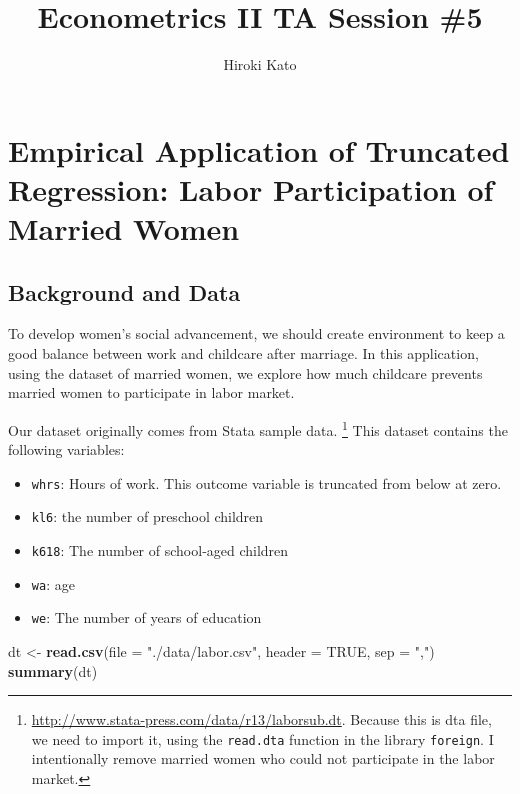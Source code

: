 \documentclass[
  12pt,
]{article}
\title{Econometrics II TA Session \#5}
\author{Hiroki Kato}
\date{}
\newenvironment{Shaded}{\begin{snugshade}}{\end{snugshade}}
\newcommand{\DataTypeTok}[1]{\textcolor[rgb]{0.13,0.29,0.53}{#1}}
\newcommand{\KeywordTok}[1]{\textcolor[rgb]{0.13,0.29,0.53}{\textbf{#1}}}
\newcommand{\NormalTok}[1]{#1}
\newcommand{\OtherTok}[1]{\textcolor[rgb]{0.56,0.35,0.01}{#1}}
\newcommand{\StringTok}[1]{\textcolor[rgb]{0.31,0.60,0.02}{#1}}
\providecommand{\tightlist}{%
  \setlength{\itemsep}{0pt}\setlength{\parskip}{0pt}}
\begin{document}
\maketitle

\hypertarget{empirical-application-of-truncated-regression-labor-participation-of-married-women}{%
\section{Empirical Application of Truncated Regression: Labor
Participation of Married
Women}\label{empirical-application-of-truncated-regression-labor-participation-of-married-women}}

\hypertarget{background-and-data}{%
\subsection{Background and Data}\label{background-and-data}}

To develop women's social advancement, we should create environment to
keep a good balance between work and childcare after marriage. In this
application, using the dataset of married women, we explore how much
childcare prevents married women to participate in labor market.

Our dataset originally comes from Stata sample data. \footnote{\url{http://www.stata-press.com/data/r13/laborsub.dt}.
  Because this is dta file, we need to import it, using the
  \texttt{read.dta} function in the library \texttt{foreign}. I
  intentionally remove married women who could not participate in the
  labor market.} This dataset contains the following variables:

\begin{itemize}
\tightlist
\item
  \texttt{whrs}: Hours of work. This outcome variable is truncated from
  below at zero.
\item
  \texttt{kl6}: the number of preschool children
\item
  \texttt{k618}: The number of school‐aged children
\item
  \texttt{wa}: age
\item
  \texttt{we}: The number of years of education
\end{itemize}

\begin{Shaded}
\begin{Highlighting}[]
\NormalTok{dt \textless{}{-}}\StringTok{ }\KeywordTok{read.csv}\NormalTok{(}\DataTypeTok{file =} \StringTok{"./data/labor.csv"}\NormalTok{, }\DataTypeTok{header =} \OtherTok{TRUE}\NormalTok{,  }\DataTypeTok{sep =} \StringTok{","}\NormalTok{)}
\KeywordTok{summary}\NormalTok{(dt)}
\end{Highlighting}
\end{Shaded}
\end{document}
